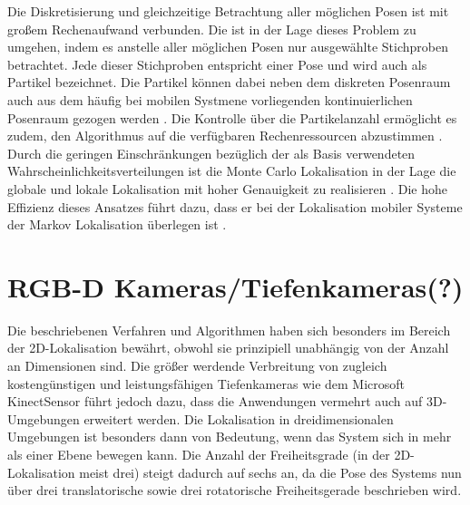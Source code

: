 Die Diskretisierung und gleichzeitige Betrachtung aller möglichen Posen ist mit großem Rechenaufwand verbunden. Die  ist in der Lage dieses Problem zu umgehen, indem es anstelle aller möglichen Posen nur ausgewählte Stichproben betrachtet. Jede dieser Stichproben entspricht einer Pose und wird auch als Partikel bezeichnet. Die Partikel können dabei neben dem diskreten Posenraum auch aus dem häufig bei mobilen Systmene vorliegenden kontinuierlichen Posenraum gezogen werden \cite{Fox2001}. Die Kontrolle über die Partikelanzahl ermöglicht es zudem, den Algorithmus auf die verfügbaren Rechenressourcen abzustimmen \cite{Thrun2001}.\\
Durch die geringen Einschränkungen bezüglich der als Basis verwendeten Wahrscheinlichkeitsverteilungen ist die Monte Carlo Lokalisation in der Lage die globale und lokale Lokalisation mit hoher Genauigkeit zu realisieren \cite{Thrun2005}. Die hohe Effizienz dieses Ansatzes führt dazu, dass er bei der Lokalisation mobiler Systeme der Markov Lokalisation \red[deutlich] überlegen ist \cite{Fox2001}.




\section{RGB-D Kameras/Tiefenkameras(?)}
Die beschriebenen Verfahren und Algorithmen haben sich besonders im Bereich der 2D-Lokalisation bewährt, obwohl sie prinzipiell unabhängig von der Anzahl an Dimensionen sind. Die größer werdende Verbreitung von zugleich kostengünstigen und leistungsfähigen Tiefenkameras wie dem Microsoft Kinect\red[Tm] Sensor führt jedoch dazu, dass die Anwendungen vermehrt auch auf 3D-Umgebungen erweitert werden. Die Lokalisation in dreidimensionalen Umgebungen ist besonders dann von Bedeutung, wenn das System sich in mehr als einer Ebene bewegen kann. Die Anzahl der Freiheitsgrade (in der 2D-Lokalisation meist drei) steigt dadurch auf sechs an, da die Pose des Systems nun über drei translatorische sowie drei rotatorische Freiheitsgerade beschrieben wird.\\


